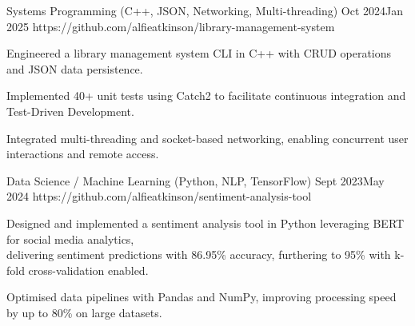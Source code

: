 {    
    {Systems Programming (C++, JSON, Networking, Multi-threading)}
    {Oct 2024}{Jan 2025}
    {https://github.com/alfieatkinson/library-management-system}
    {}
    {
        \item Engineered a library management system CLI in C++ with CRUD operations and JSON data persistence.\vspace{-0.5mm}
        \item Implemented 40+ unit tests using Catch2 to facilitate continuous integration and Test-Driven Development.\vspace{-0.5mm}
        \item Integrated multi-threading and socket-based networking, enabling concurrent user interactions and remote access.
    }

    {Data Science / Machine Learning (Python, NLP, TensorFlow)}
    {Sept 2023}{May 2024}
    {https://github.com/alfieatkinson/sentiment-analysis-tool}
    {}
    {
        \item Designed and implemented a sentiment analysis tool in Python leveraging BERT for social media analytics, \\delivering sentiment predictions with 86.95\% accuracy, furthering to 95\% with k-fold cross-validation enabled.\vspace{-0.5mm}
        \item Optimised data pipelines with Pandas and NumPy, improving processing speed by up to 80\% on large datasets.
    }
}
